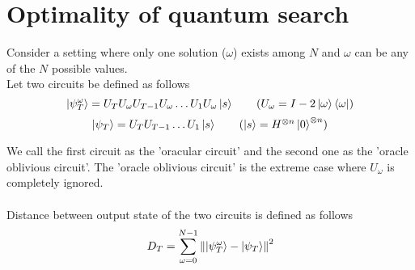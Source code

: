 \documentclass[11.5pt, paper=a4]{article}
\theoremstyle{definition}
\numberwithin{theorem}{section}
\begin{document}
\section{Optimality of quantum search}

Consider a setting where only one solution ($\omega$) exists among $N$ and $\omega$ can be any of the $N$ possible values.\\
Let two circuits be defined as follows
\begin{equation*}
    \ket{\psi^\omega_T} = U_TU_\omega U_{T-1}U_\omega\hdots U_1U_\omega\ket{s} \tag{$U_\omega = I - 2\ket{\omega}\bra{\omega}$}
\end{equation*}
\begin{equation*}
    \ket{\psi_T} = U_TU_{T-1}\hdots U_1\ket{s} \tag{$\ket{s} = H^{\otimes n}\ket{0}^{\otimes n}$}
\end{equation*}

\noindent We call the first circuit as the 'oracular circuit' and the second one as the 'oracle oblivious circuit'. The 'oracle oblivious circuit' is the extreme case where $U_\omega$ is completely ignored.\\ \\
Distance between output state of the two circuits is defined as follows
\begin{equation*}
    D_T = \sum_{\omega=0}^{N-1}\norm{\ket{\psi^\omega_T}-\ket{\psi_T}}^2
\end{equation*}
\end{document}
